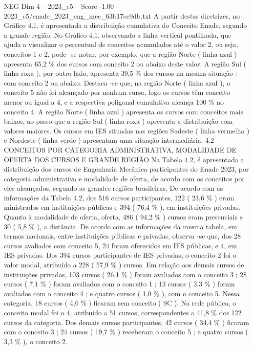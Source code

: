 \begin{textsample}{NEG Dim 4 – 2023\_c5 – Score -1.00 – 2023\_c5/enade\_2023\_eng\_mec\_63b17ce9db.txt}
A partir destas diretrizes, no Gráfico 4.1, é apresentada a distribuição cumulativa do Conceito Enade, segundo a grande região.
No Gráfico 4.1, observando a linha vertical pontilhada, que ajuda a visualizar o percentual de conceitos acumulados até o valor 2, ou seja, conceitos 1 e 2, pode -se notar, por exemplo, que a região Norte ( linha azul ) apresenta 65,2 \% dos cursos com conceito 2 ou abaixo deste valor.
A região Sul ( linha roxa ), por outro lado, apresenta 39,5 \% dos cursos na mesma situação : com conceito 2 ou abaixo.
Destaca -se que, na região Norte ( linha azul ), o conceito 5 não foi alcançado por nenhum curso, logo os cursos têm conceito menor ou igual a 4, e a respectiva poligonal cumulativa alcança 100 \% no conceito 4.
A região Norte ( linha azul ) apresenta os cursos com conceitos mais baixos, ao passo que a região Sul ( linha roxa ) apresenta a distribuição com valores maiores.
Os cursos em IES situadas nas regiões Sudeste ( linha vermelha ) e Nordeste ( linha verde ) apresentam uma situação intermediária. 4.2 CONCEITOS POR CATEGORIA ADMINISTRATIVA, MODALIDADE DE OFERTA DOS CURSOS E GRANDE REGIÃO Na Tabela 4.2, é apresentada a distribuição dos cursos de Engenharia Mecânica participantes do Enade 2023, por categoria administrativa e modalidade de oferta, de acordo com os conceitos por eles alcançados, segundo as grandes regiões brasileiras.
De acordo com as informações da Tabela 4.2, dos 516 cursos participantes, 122 ( 23,6 \% ) eram ministrados em instituições públicas e 394 ( 76,4 \% ), em instituições privadas.
Quanto à modalidade de oferta, oferta, 486 ( 94,2 \% ) cursos eram presenciais e 30 ( 5,8 \% ), a distância.
De acordo com as informações da mesma tabela, em termos nacionais, entre instituições públicas e privadas, observa -se que, dos 28 cursos avaliados com conceito 5, 24 foram oferecidos em IES públicas, e 4, em IES privadas.
Dos 394 cursos participantes de IES privadas, o conceito 2 foi o valor modal, atribuído a 228 ( 57,9 \% ) cursos.
Em relação aos demais cursos de instituições privadas, 103 cursos ( 26,1 \% ) foram avaliados com o conceito 3 ; 28 cursos ( 7,1 \% ) foram avaliados com o conceito 1 ; 13 cursos ( 3,3 \% ) foram avaliados com o conceito 4 ; e quatro cursos ( 1,0 \% ), com o conceito 5.
Nessa categoria, 18 cursos ( 4,6 \% ) ficaram sem conceito ( SC ).
Na rede pública, o conceito modal foi o 4, atribuído a 51 cursos, correspondentes a 41,8 \% dos 122 cursos da categoria.
Dos demais cursos participantes, 42 cursos ( 34,4 \% ) ficaram com o conceito 3 ; 24 cursos ( 19,7 \% ) receberam o conceito 5 ; e quatro cursos ( 3,3 \% ), o conceito 2.

\end{textsample}
